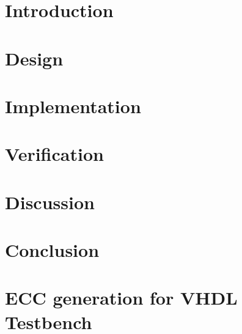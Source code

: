 \documentclass[titlepage,12pt,a4paper]{article}
\begin{document}


\newpage
\tableofcontents
\listoffigures
\listoftables

\newpage
{}

\section{Introduction}

\newpage
\section{Design}
\label{sec:design}

\newpage
\section{Implementation}

\newpage
\section{Verification}

\newpage
\section{Discussion}

\newpage
\section{Conclusion}

\newpage

\appendix
\section{ECC generation for VHDL Testbench}
\label{apx:ecc}



\end{document}
